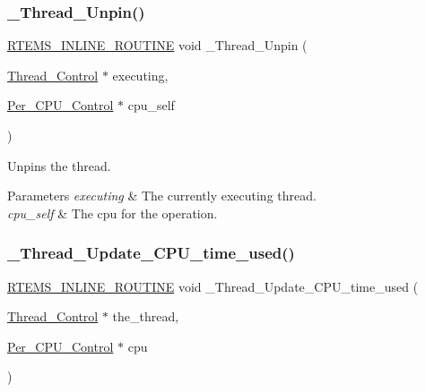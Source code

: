 \subsubsection{\texorpdfstring{\_Thread\_Unpin()}{\_Thread\_Unpin()}}
{\footnotesize\ttfamily \mbox{\hyperlink{group__RTEMSScoreBaseDefs_gac216239df231d5dbd15e3520b0b9313f}{R\+T\+E\+M\+S\+\_\+\+I\+N\+L\+I\+N\+E\+\_\+\+R\+O\+U\+T\+I\+NE}} void \+\_\+\+Thread\+\_\+\+Unpin (\begin{DoxyParamCaption}\item[{\mbox{\hyperlink{struct__Thread__Control}{Thread\+\_\+\+Control}} $\ast$}]{executing,  }\item[{\mbox{\hyperlink{structPer__CPU__Control}{Per\+\_\+\+C\+P\+U\+\_\+\+Control}} $\ast$}]{cpu\+\_\+self }\end{DoxyParamCaption})}



Unpins the thread. 


\begin{DoxyParams}{Parameters}
{\em executing} & The currently executing thread. \\
\hline
{\em cpu\+\_\+self} & The cpu for the operation. \\
\hline
\end{DoxyParams}
\mbox{\label{group__RTEMSScoreThread_ga02a75f308e726ba3f36a97cd758a8e7e}} 
\subsubsection{\texorpdfstring{\_Thread\_Update\_CPU\_time\_used()}{\_Thread\_Update\_CPU\_time\_used()}}
{\footnotesize\ttfamily \mbox{\hyperlink{group__RTEMSScoreBaseDefs_gac216239df231d5dbd15e3520b0b9313f}{R\+T\+E\+M\+S\+\_\+\+I\+N\+L\+I\+N\+E\+\_\+\+R\+O\+U\+T\+I\+NE}} void \+\_\+\+Thread\+\_\+\+Update\+\_\+\+C\+P\+U\+\_\+time\+\_\+used (\begin{DoxyParamCaption}\item[{\mbox{\hyperlink{struct__Thread__Control}{Thread\+\_\+\+Control}} $\ast$}]{the\+\_\+thread,  }\item[{\mbox{\hyperlink{structPer__CPU__Control}{Per\+\_\+\+C\+P\+U\+\_\+\+Control}} $\ast$}]{cpu }\end{DoxyParamCaption})}



